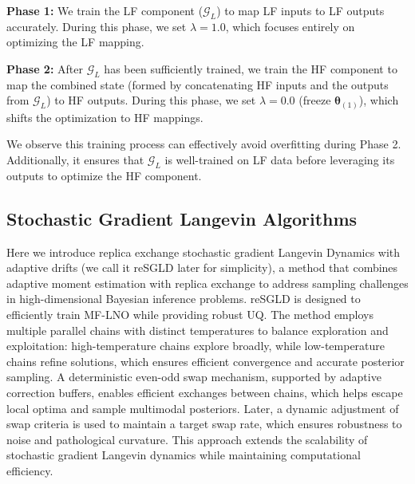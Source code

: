 \textbf{Phase 1:} We train the LF component ($\mathcal{G}_L$) to map LF inputs to LF outputs accurately. During this phase, we set $\lambda = 1.0$, which focuses entirely on optimizing the LF mapping.  

\textbf{Phase 2:} After $\mathcal{G}_L$ has been sufficiently trained, we train the HF component to map the combined state (formed by concatenating HF inputs and the outputs from $\mathcal{G}_L$) to HF outputs. During this phase, we set $\lambda = 0.0$ (freeze ${\boldsymbol{\theta}}_{(1)}$), which shifts the optimization to HF mappings.  

We observe this training process can effectively avoid overfitting during Phase 2. Additionally, it ensures that $\mathcal{G}_L$ is well-trained on LF data before leveraging its outputs to optimize the HF component.

\subsection{Stochastic Gradient Langevin Algorithms}

Here we introduce replica exchange stochastic gradient Langevin Dynamics with adaptive drifts (we call it reSGLD later for simplicity), a method that combines adaptive moment estimation with replica exchange to address sampling challenges in high-dimensional Bayesian inference problems. reSGLD is designed to efficiently train MF-LNO while providing robust UQ. The method employs multiple parallel chains with distinct temperatures to balance exploration and exploitation: high-temperature chains explore broadly, while low-temperature chains refine solutions, which ensures efficient convergence and accurate posterior sampling. A deterministic even-odd swap mechanism, supported by adaptive correction buffers, enables efficient exchanges between chains, which helps escape local optima and sample multimodal posteriors. Later, a dynamic adjustment of swap criteria is used to maintain a target swap rate, which ensures robustness to noise and pathological curvature. This approach extends the scalability of stochastic gradient Langevin dynamics while maintaining computational efficiency.

